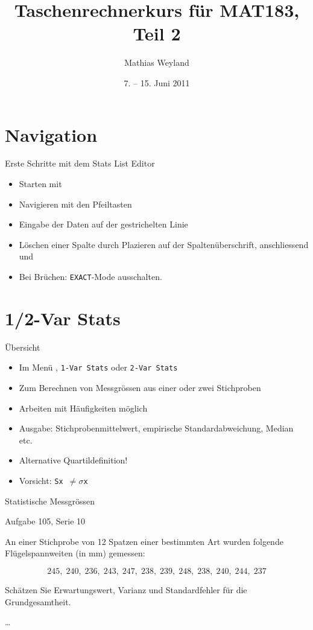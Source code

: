\documentclass[handout]{beamer}
\title{Taschenrechnerkurs für MAT183, Teil 2}
\author{Mathias Weyland}
\date{7. -- 15. Juni 2011}
\newlength{\tikey}
\newcommand{\keystroke}[1]{\settowidth{\tikey}{\scriptsize #1}\psframebox[framearc=0.2]{\parbox{\tikey}{\scriptsize #1}}}
\begin{document}
\frame{\maketitle}


\section{Navigation}
\begin{frame}{Erste Schritte mit dem Stats List Editor}
\begin{itemize}
\item Starten mit \keystroke{APPS}
\item Navigieren mit den Pfeiltasten
\item Eingabe der Daten auf der gestrichelten Linie
\item Löschen einer Spalte durch Plazieren auf der Spaltenüberschrift, anschliessend \keystroke{CLEAR} und \keystroke{ENTER}
\item Bei Brüchen: \texttt{EXACT}-Mode ausschalten.
\end{itemize}
\end{frame}

\section{1/2-Var Stats}
\begin{frame}{Übersicht}
\begin{itemize}
\item Im Menü \keystroke{F4}, \texttt{1-Var Stats} oder \texttt{2-Var Stats}
\item Zum Berechnen von Messgrössen aus einer oder zwei Stichproben
\item Arbeiten mit Häufigkeiten möglich
\item Ausgabe: Stichprobenmittelwert, empirische Standardabweichung, Median etc.
\item Alternative Quartildefinition!
\item Vorsicht: \texttt{Sx $\ne\sigma$x}
\end{itemize}
\end{frame}

\begin{frame}{Statistische Messgrössen}
\begin{beamerboxesrounded}[shadow]{Aufgabe 105, Serie 10}

An einer Stichprobe von 12 Spatzen einer bestimmten Art wurden folgende
Flügelspannweiten (in mm) gemessen:

$$
245,\; 240,\; 236,\; 243,\; 247,\; 238,\; 239,\; 248,\; 238,\; 240,\; 244,\; 237
$$

\begin{outline}
\item Schätzen Sie Erwartungswert, Varianz und Standardfehler für die Grundgesamtheit.
\item \dots
\end{outline}
\end{beamerboxesrounded}
\end{frame}
\end{document}
